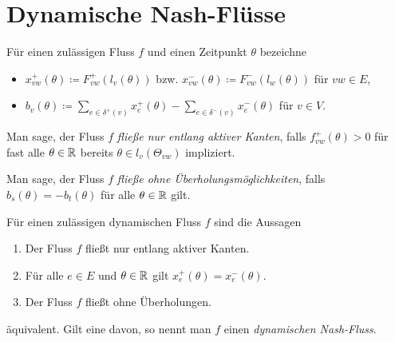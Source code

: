 \section{Dynamische Nash-Flüsse}

\begin{frame}
	\begin{definition}
		Für einen zulässigen Fluss $f$ und einen Zeitpunkt $\theta$ bezeichne
		\begin{itemize}[label=\color{darkblue}$\bullet$]
			\item $x_{vw}^+(\theta)\coloneq  F_{vw}^+(l_v(\theta))$ bzw. $x_{vw}^-(\theta)\coloneq  F^-_{vw}(l_w(\theta))$ für $vw\in E$,
			\pause\item $b_v(\theta) \coloneq  \sum_{e\in\delta^+(v)} x_e^+(\theta) - \sum_{e\in\delta^-(v)} x_e^-(\theta)$ für $v\in V$.
		\end{itemize}
	\end{definition}
	
	\pause\begin{definition}\label{def-flow-along-active-edges}
		Man sage, der Fluss $f$ \emph{fließe nur entlang aktiver Kanten}, falls $f_{vw}^+(\theta) > 0$ für fast alle $\theta\in\mathbb{R}$ bereits $\theta\in l_v(\Theta_{vw})$ impliziert.
	\end{definition}

	\pause\begin{definition}
	Man sage, der Fluss $f$ \emph{fließe ohne Überholungsmöglichkeiten}, falls $b_s(\theta) = -b_t(\theta)$ für alle $\theta\in\mathbb{R}$ gilt.
	\end{definition}
\end{frame}

\begin{frame}
	\begin{theorem}\label{thm-equivalencies-nash-flow}
		Für einen zulässigen dynamischen Fluss $f$ sind die Aussagen
		\begin{enumerate}[label=(\roman*)]
			\item Der Fluss $f$ fließt nur entlang aktiver Kanten.
			\item Für alle $e\in E$ und $\theta\in\mathbb{R}$ gilt $x_e^+(\theta) = x_e^-(\theta)$.
			\item Der Fluss $f$ fließt ohne Überholungen.
		\end{enumerate}
		äquivalent. Gilt eine davon, so nennt man $f$ einen \emph{dynamischen Nash-Fluss}.
	\end{theorem}
\end{frame}